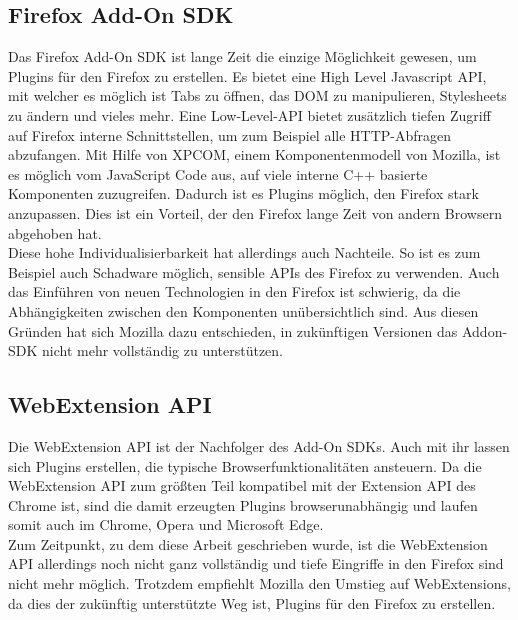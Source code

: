 \subsection{Firefox Add-On SDK}
Das Firefox Add-On SDK ist lange Zeit die einzige Möglichkeit gewesen, um Plugins für den Firefox zu erstellen. Es bietet eine High Level Javascript API, mit welcher es möglich ist Tabs zu öffnen, das DOM zu manipulieren, Stylesheets zu ändern und vieles mehr. Eine Low-Level-API bietet zusätzlich tiefen Zugriff auf Firefox interne Schnittstellen, um zum Beispiel alle HTTP-Abfragen abzufangen. Mit Hilfe von XPCOM, einem Komponentenmodell von Mozilla, ist es möglich vom JavaScript Code aus, auf viele interne C++ basierte Komponenten zuzugreifen. Dadurch ist es Plugins möglich, den Firefox stark anzupassen. Dies ist ein Vorteil, der den Firefox lange Zeit von andern Browsern abgehoben hat. \\
Diese hohe Individualisierbarkeit hat allerdings auch Nachteile. So ist es zum Beispiel auch Schadware möglich, sensible APIs des Firefox zu verwenden. Auch das Einführen von neuen Technologien in den Firefox ist schwierig, da die Abhängigkeiten zwischen den Komponenten unübersichtlich sind. Aus diesen Gründen hat sich Mozilla dazu entschieden, in zukünftigen Versionen das Addon-SDK nicht mehr vollständig zu unterstützen. \cite{FirefoxAddonFuture}
\subsection{WebExtension API}
Die WebExtension API ist der Nachfolger des Add-On SDKs. Auch mit ihr lassen sich Plugins erstellen, die typische Browserfunktionalitäten ansteuern. Da die WebExtension API zum größten Teil kompatibel mit der Extension API des Chrome ist, sind die damit erzeugten Plugins browserunabhängig und laufen somit auch im Chrome, Opera und Microsoft Edge. \\
Zum Zeitpunkt, zu dem diese Arbeit geschrieben wurde, ist die WebExtension API allerdings noch nicht ganz vollständig und tiefe Eingriffe in den Firefox sind nicht mehr möglich. Trotzdem empfiehlt Mozilla den Umstieg auf WebExtensions, da dies der zukünftig unterstützte Weg ist, Plugins für den Firefox zu erstellen.
